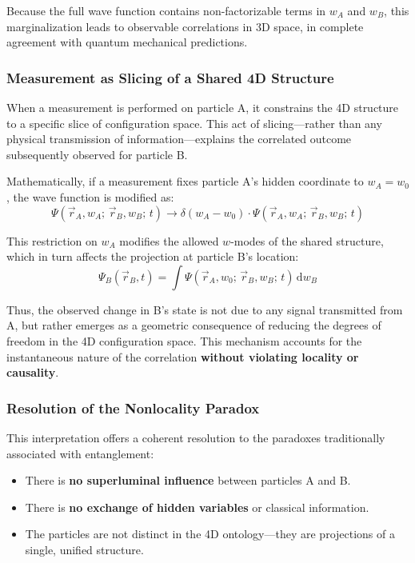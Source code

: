 \documentclass[12pt]{article}
\begin{document}
Because the full wave function contains non-factorizable terms in \( w_A \) and \( w_B \), this marginalization leads to observable correlations in 3D space, in complete agreement with quantum mechanical predictions.

\subsubsection{Measurement as Slicing of a Shared 4D Structure}

When a measurement is performed on particle A, it constrains the 4D structure to a specific slice of configuration space. This act of slicing—rather than any physical transmission of information—explains the correlated outcome subsequently observed for particle B.

Mathematically, if a measurement fixes particle A’s hidden coordinate to \( w_A = w_0 \), the wave function is modified as:
\begin{equation}
\Psi(\vec{r}_A, w_A;\, \vec{r}_B, w_B;\, t) \longrightarrow \delta(w_A - w_0) \cdot \Psi(\vec{r}_A, w_A;\, \vec{r}_B, w_B;\, t)
\end{equation}

This restriction on \( w_A \) modifies the allowed \( w \)-modes of the shared structure, which in turn affects the projection at particle B’s location:
\begin{equation}
\Psi_B(\vec{r}_B, t) = \int \Psi(\vec{r}_A, w_0;\, \vec{r}_B, w_B;\, t) \, \mathrm{d}w_B
\end{equation}

Thus, the observed change in B’s state is not due to any signal transmitted from A, but rather emerges as a geometric consequence of reducing the degrees of freedom in the 4D configuration space. This mechanism accounts for the instantaneous nature of the correlation \textbf{without violating locality or causality}.

\subsubsection{Resolution of the Nonlocality Paradox}

This interpretation offers a coherent resolution to the paradoxes traditionally associated with entanglement:
\begin{itemize}
  \item There is \textbf{no superluminal influence} between particles A and B.
  \item There is \textbf{no exchange of hidden variables} or classical information.
  \item The particles are not distinct in the 4D ontology—they are projections of a single, unified structure.
\end{itemize}
\end{document}
